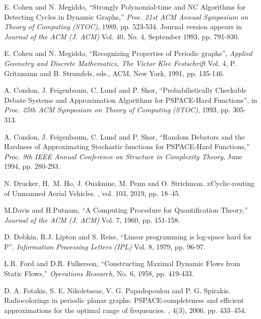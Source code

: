 \begin{thebibliography}{HMRR93}
E. Cohen and  N. Megiddo,
``Strongly Polynomial-time and NC Algorithms for 
Detecting Cycles in Dynamic Graphs,''
{\em Proc. 21st ACM Annual Symposium on Theory of Computing (STOC)}, 
1989, pp. 523-534. 
Journal version  appears in {\em Journal of the ACM (J. ACM)} Vol. 40,
No. 4, September 1993, pp. 791-830.




E. Cohen and N. Megiddo,
``Recognizing Properties of Periodic graphs'',
{\em Applied Geometry and Discrete Mathematics, The Victor Klee Festschrift}
Vol. 4, P. Gritzmann and B. Strumfels, eds., ACM, New York, 1991, pp. 135-146.




 A. Condon, J. Feigenbaum, C. Lund and P. Shor,
``Probabilistically Checkable Debate Systems and Approximation Algorithms
for PSPACE-Hard Functions'', in  
{\em Proc.  25th ACM Symposium on Theory of Computing (STOC)}, 
1993, pp. 305-313.


 A. Condon, J. Feigenbaum, C. Lund and P. Shor,
``Random Debators and the Hardness of Approximating
Stochastic functions for PSPACE-Hard Functions,'' 
{\em Proc. 9th IEEE Annual Conference on Structure in Complexity Theory}, 
June 1994, pp. 280-293. 

\newblock N. Drucker, H.~M. Ho, J. Ouaknine, M. Penn and O. Strichman.
\newblock xCyclic-routing of Unmanned Aerial Vehicles.
,
vol. 103, 2019, pp. 18--45.

M.Davis and H.Putnam, 
``A Computing Procedure for Quantification Theory,''
{\em Journal of the ACM (J. ACM)} 
Vol. 7, 1960, pp. 151-158.




D. Dobkin, R.J. Lipton and S. Reiss,
``Linear programming is log-space hard for P'',
{\em Information Processing Letters (IPL)} 
Vol. 8, 1979, pp. 96-97.


L.R. Ford and D.R. Fulkerson,
``Constructing Maximal Dynamic Flows from Static Flows,''
{\em Operations Research,}
No. 6, 1958, pp. 419-433.


D. A. Fotakis, S. E. Nikoletseas, V. G. Papadopoulou and P. G. Spirakis.
\newblock Radiocolorings in periodic planar graphs: {PSPACE}-completeness 
and efficient approximations for the optimal range of frequencies.
, 4(3), 2006, pp. 433--454.



\end{thebibliography}
